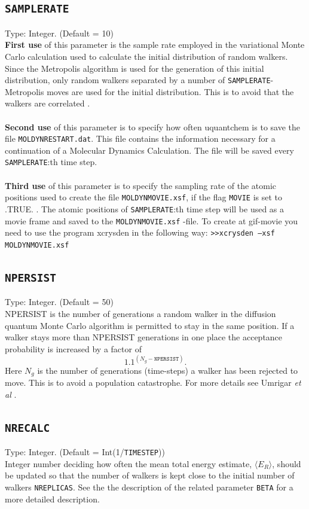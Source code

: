 \documentclass[a4paper,twoside,openany]{book}
\begin{document}
{{\subsection{\texttt{SAMPLERATE}}
Type: Integer. (Default = 10)\\
{\bf First use} of this parameter is the sample rate employed  in the variational Monte Carlo calculation used to calculate the initial distribution of random walkers. Since the Metropolis algorithm is 
used for the generation of this initial distribution, only random walkers separated by a number of \texttt{SAMPLERATE}-Metropolis moves are used for the initial distribution.
This is  to avoid that the walkers  are correlated \cite{Koonin}. \\ \\
\noindent
{\bf Second use} of this parameter is to specify how often uquantchem is to save the file \texttt{MOLDYNRESTART.dat}. This file contains the information necessary for a continuation of a
Molecular Dynamics Calculation. The file will be saved every \texttt{SAMPLERATE}:th time step. \\ \\
\noindent
{\bf Third use} of this parameter is to specify the sampling rate of the atomic positions used to create the file \texttt{MOLDYNMOVIE.xsf}, if the flag \texttt{MOVIE} is set to .TRUE. .
The atomic positions of  \texttt{SAMPLERATE}:th time step will be used as a movie frame and saved to the \texttt{MOLDYNMOVIE.xsf} -file. To create at gif-movie you need to use
the program xcrysden in the following way: \texttt{>>xcrysden --xsf  MOLDYNMOVIE.xsf}


\subsection{\texttt{NPERSIST}}
Type: Integer. (Default = 50)\\
NPERSIST is the number of generations a random walker in the diffusion quantum Monte Carlo algorithm is permitted to stay in the same position. If a walker 
stays more than NPERSIST generations in one place the acceptance probability is increased by a factor of
\begin{equation}
1.1^{(N_{g}-\texttt{NPERSIST})}. 
 \end{equation}
Here  $N_{g}$ is the number of generations (time-steps) a walker has been rejected to move. This is to avoid a population catastrophe. For more details see Umrigar {\it et al} \cite{UMRIGAR}.

\subsection{\texttt{NRECALC}}
Type: Integer. (Default = Int(1/\texttt{TIMESTEP}))\\
Integer number deciding how often the mean total energy estimate, $\langle E_{R} \rangle$, should be updated so that the number  of walkers is kept close to the initial 
number of walkers \texttt{NREPLICAS}. See the the description of the related parameter \texttt{BETA} for a more detailed description.

}}
\end{document}
